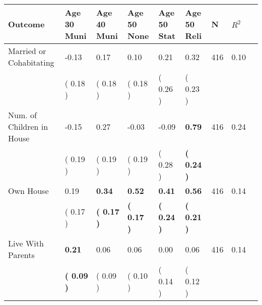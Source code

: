 \begin{tabular}{L{6.2cm} C{1.8cm} C{1.8cm} C{1.8cm} C{1.8cm} C{1.8cm} C{1.8cm} C{0.3cm} C{0.3cm}}
\toprule
 \textbf{Outcome} & \textbf{Age 30 Muni} & \textbf{Age 40 Muni} & \textbf{Age 50 None} & \textbf{Age 50 Stat} & \textbf{Age 50 Reli} & \textbf{N} & \textbf{$ R^2$} \\
\midrule
Married or Cohabitating &     -0.13 &      0.17 &      0.10 &      0.21 &      0.32  & 416 &       0.10 \\ 
 & (     0.18 ) & (     0.18 ) & (     0.18 ) & (     0.26 ) & (     0.23 )  & \\
Num. of Children in House &     -0.15 &      0.27 &     -0.03 &     -0.09 & \textbf{     0.79}  & 416 &       0.24 \\ 
 & (     0.19 ) & (     0.19 ) & (     0.19 ) & (     0.28 ) & \textbf{(     0.24 )}  & \\
Own House &      0.19 & \textbf{     0.34} & \textbf{     0.52} & \textbf{     0.41} & \textbf{     0.56}  & 416 &       0.14 \\ 
 & (     0.17 ) & \textbf{(     0.17 )} & \textbf{(     0.17 )} & \textbf{(     0.24 )} & \textbf{(     0.21 )}  & \\
Live With Parents & \textbf{     0.21} &      0.06 &      0.06 &      0.00 &      0.06  & 416 &       0.14 \\ 
 & \textbf{(     0.09 )} & (     0.09 ) & (     0.10 ) & (     0.14 ) & (     0.12 )  & \\
\bottomrule
\end{tabular}
